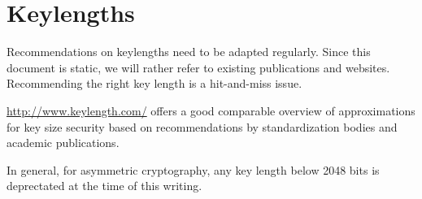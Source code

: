 \section{Keylengths}

Recommendations on keylengths need to be adapted regularly. Since this document is static, we will rather refer to 
existing publications and websites.  Recommending the right key length is a hit-and-miss issue.

\url{http://www.keylength.com/} offers a good comparable overview of approximations for key size security based on recommendations by standardization bodies and academic publications.

In general, for asymmetric cryptography, any key length below 2048 bits is deprectated at the time of this writing.




